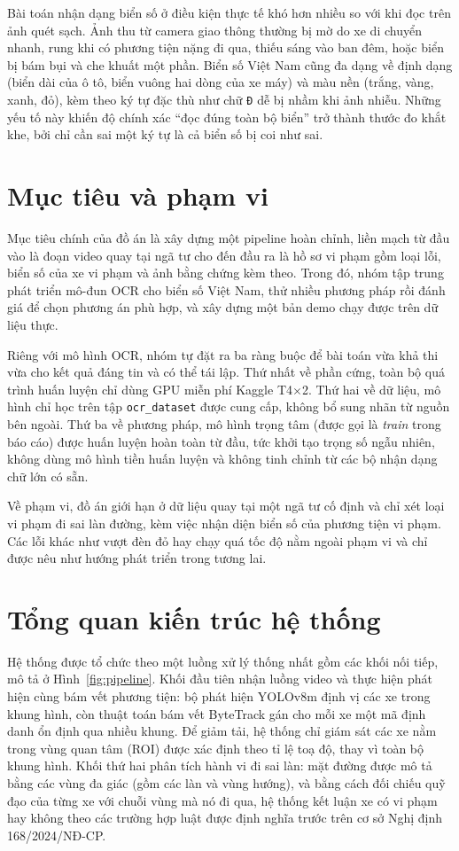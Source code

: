 \documentclass[12pt,a4paper]{report}
\begin{document}
Bài toán nhận dạng biển số ở điều kiện thực tế khó hơn nhiều so với khi đọc trên ảnh quét sạch. Ảnh thu từ camera giao thông thường bị mờ do xe di chuyển nhanh, rung khi có phương tiện nặng đi qua, thiếu sáng vào ban đêm, hoặc biển bị bám bụi và che khuất một phần. Biển số Việt Nam cũng đa dạng về định dạng (biển dài của ô tô, biển vuông hai dòng của xe máy) và màu nền (trắng, vàng, xanh, đỏ), kèm theo ký tự đặc thù như chữ \texttt{Đ} dễ bị nhầm khi ảnh nhiễu. Những yếu tố này khiến độ chính xác ``đọc đúng toàn bộ biển'' trở thành thước đo khắt khe, bởi chỉ cần sai một ký tự là cả biển số bị coi như sai.

\section{Mục tiêu và phạm vi}
Mục tiêu chính của đồ án là xây dựng một pipeline hoàn chỉnh, liền mạch từ đầu vào là đoạn video quay tại ngã tư cho đến đầu ra là hồ sơ vi phạm gồm loại lỗi, biển số của xe vi phạm và ảnh bằng chứng kèm theo. Trong đó, nhóm tập trung phát triển mô-đun OCR cho biển số Việt Nam, thử nhiều phương pháp rồi đánh giá để chọn phương án phù hợp, và xây dựng một bản demo chạy được trên dữ liệu thực.

Riêng với mô hình OCR, nhóm tự đặt ra ba ràng buộc để bài toán vừa khả thi vừa cho kết quả đáng tin và có thể tái lập. Thứ nhất về phần cứng, toàn bộ quá trình huấn luyện chỉ dùng GPU miễn phí Kaggle T4$\times$2. Thứ hai về dữ liệu, mô hình chỉ học trên tập \texttt{ocr\_dataset} được cung cấp, không bổ sung nhãn từ nguồn bên ngoài. Thứ ba về phương pháp, mô hình trọng tâm (được gọi là \emph{train} trong báo cáo) được huấn luyện hoàn toàn từ đầu, tức khởi tạo trọng số ngẫu nhiên, không dùng mô hình tiền huấn luyện và không tinh chỉnh từ các bộ nhận dạng chữ lớn có sẵn.

Về phạm vi, đồ án giới hạn ở dữ liệu quay tại một ngã tư cố định và chỉ xét loại vi phạm đi sai làn đường, kèm việc nhận diện biển số của phương tiện vi phạm. Các lỗi khác như vượt đèn đỏ hay chạy quá tốc độ nằm ngoài phạm vi và chỉ được nêu như hướng phát triển trong tương lai.

\section{Tổng quan kiến trúc hệ thống}
Hệ thống được tổ chức theo một luồng xử lý thống nhất gồm các khối nối tiếp, mô tả ở Hình~\ref{fig:pipeline}. Khối đầu tiên nhận luồng video và thực hiện phát hiện cùng bám vết phương tiện: bộ phát hiện YOLOv8m định vị các xe trong khung hình, còn thuật toán bám vết ByteTrack gán cho mỗi xe một mã định danh ổn định qua nhiều khung. Để giảm tải, hệ thống chỉ giám sát các xe nằm trong vùng quan tâm (ROI) được xác định theo tỉ lệ toạ độ, thay vì toàn bộ khung hình. Khối thứ hai phân tích hành vi đi sai làn: mặt đường được mô tả bằng các vùng đa giác (gồm các làn và vùng hướng), và bằng cách đối chiếu quỹ đạo của từng xe với chuỗi vùng mà nó đi qua, hệ thống kết luận xe có vi phạm hay không theo các trường hợp luật được định nghĩa trước trên cơ sở Nghị định 168/2024/NĐ-CP.
\end{document}
